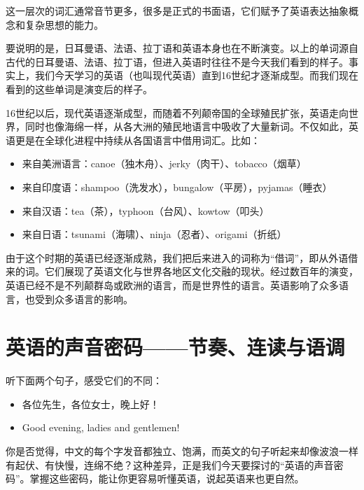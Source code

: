 \documentclass[10.5pt, a4paper]{ctexbook} %
\begin{document}
这一层次的词汇通常音节更多，很多是正式的书面语，它们赋予了英语表达抽象概念和复杂思想的能力。

要说明的是，日耳曼语、法语、拉丁语和英语本身也在不断演变。以上的单词源自古代的日耳曼语、法语、拉丁语，但进入英语时往往不是今天我们看到的样子。事实上，我们今天学习的英语（也叫现代英语）直到16世纪才逐渐成型。而我们现在看到的这些单词是演变后的样子。

16世纪以后，现代英语逐渐成型，而随着不列颠帝国的全球殖民扩张，英语走向世界，同时也像海绵一样，从各大洲的殖民地语言中吸收了大量新词。不仅如此，英语更是在全球化进程中持续从各国语言中借用词汇。比如：
\begin{itemize}
    \item 来自美洲语言：canoe（独木舟）、jerky（肉干）、tobacco（烟草）
    \item 来自印度语：shampoo（洗发水），bungalow（平房），pyjamas（睡衣）
    \item 来自汉语：tea（茶），typhoon（台风）、kowtow（叩头）
    \item 来自日语：tsunami（海啸）、ninja（忍者）、origami（折纸）
\end{itemize}

由于这个时期的英语已经逐渐成熟，我们把后来进入的词称为“借词”，即从外语借来的词。它们展现了英语文化与世界各地区文化交融的现状。经过数百年的演变，英语已经不是不列颠群岛或欧洲的语言，而是世界性的语言。英语影响了众多语言，也受到众多语言的影响。

\section{英语的声音密码——节奏、连读与语调}

听下面两个句子，感受它们的不同：
\begin{center}
    \begin{minipage}{0.6\linewidth}
    \centering
        \begin{itemize}
        \item[中文：] 各位先生，各位女士，晚上好！
        \item[英文：] Good evening, ladies and gentlemen!
        \end{itemize}
    \end{minipage}
\end{center}

你是否觉得，中文的每个字发音都独立、饱满，而英文的句子听起来却像波浪一样有起伏、有快慢，连绵不绝？这种差异，正是我们今天要探讨的“英语的声音密码”。掌握这些密码，能让你更容易听懂英语，说起英语来也更自然。
\end{document}
